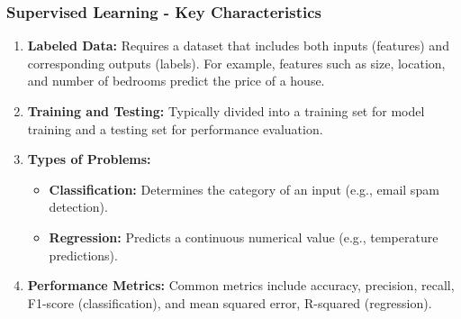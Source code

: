 \documentclass[aspectratio=169]{beamer}
\begin{document}
\begin{frame}[fragile]
    \frametitle{Supervised Learning - Key Characteristics}
    \begin{enumerate}
        \item \textbf{Labeled Data:} Requires a dataset that includes both inputs (features) and corresponding outputs (labels). For example, features such as size, location, and number of bedrooms predict the price of a house.
        \item \textbf{Training and Testing:} Typically divided into a training set for model training and a testing set for performance evaluation.
        \item \textbf{Types of Problems:}
            \begin{itemize}
                \item \textbf{Classification:} Determines the category of an input (e.g., email spam detection).
                \item \textbf{Regression:} Predicts a continuous numerical value (e.g., temperature predictions).
            \end{itemize}
        \item \textbf{Performance Metrics:} Common metrics include accuracy, precision, recall, F1-score (classification), and mean squared error, R-squared (regression).
    \end{enumerate}
\end{frame}
\end{document}
